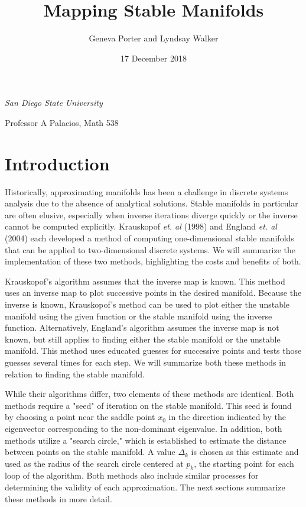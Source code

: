 \documentclass[12pt]{article}
\title{Mapping Stable Manifolds}
\author{Geneva Porter and Lyndsay Walker}
\date{17 December 2018}
\begin{document}
	
\begin{titlepage}
\maketitle
\thispagestyle{empty}


\begin{center}
	
\large \it San Diego State University 
	
Professor A Palacios, Math 538

\end{center}
\end{titlepage}

\section{Introduction}

	Historically, approximating manifolds has been a challenge in discrete systems analysis due to the absence of analytical solutions. Stable manifolds in particular are often elusive, especially when inverse iterations diverge quickly or the inverse cannot be computed explicitly. Krauskopof \textit{et. al} (1998) and England \textit{et. al} (2004) each developed a method of computing one-dimensional stable manifolds that can be applied to two-dimensional discrete systems. We will summarize the implementation of these two methods, highlighting the costs and benefits of both.
	
	Krauskopof's algorithm assumes that the inverse map is known. This method uses an inverse map to plot successive points in the desired manifold. Because the inverse is known, Krauskopof's method can be used to plot either the unstable manifold using the given function or the stable manifold using the inverse function. Alternatively, England's algorithm assumes the inverse map is not known, but still applies to finding either the stable manifold or the unstable manifold. This method uses educated guesses for successive points and tests those guesses several times for each step. We will summarize both these methods in relation to finding the stable manifold.
	
	While their algorithms differ, two elements of these methods are identical. Both methods require a "seed" of iteration on the stable manifold. This seed is found by choosing a point near the saddle point $x_0$ in the direction indicated by the eigenvector corresponding to the non-dominant eigenvalue. In addition, both methods utilize a "search circle," which is established to estimate the distance between points on the stable manifold. A value $\Delta_k$ is chosen as this estimate and used as the radius of the search circle centered at $p_k$, the starting point for each loop of the algorithm. Both methods also include similar processes for determining the validity of each approximation. The next sections summarize these methods in more detail. 
\end{document}
